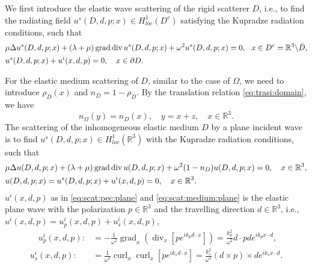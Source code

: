 \documentclass[a4paper,11pt]{article}
\theoremstyle{remark}
\theoremstyle{definition}
\numberwithin{equation}{section}
\DeclareMathOperator{\curl}{curl}
\DeclareMathOperator{\Div}{div}
\DeclareMathOperator{\grad}{grad}
\begin{document}
 We first introduce the elastic wave scattering of the rigid scatterer $D$, i.e., to find the radiating field $u^s(D,d,p;x) \in H^{1}_{loc}(D^c)$ satisfying the Kupradze radiation conditions, such that
\begin{align}
&\mu \Delta u^s(D,d,p;x) +(\lambda + \mu) \grad \Div u^s(D,d,p;x) + \omega^2 u^s(D,d,p;x)  = 0,
 \ \  x \in D^c = \mathbb{R}^3\backslash \bar D, \notag \\
& u^s(D,d,p;x) + u^i(x,d,p) = 0, \quad   x \in \partial D. \label{eq:scat:pec:plane}
\end{align}


For the elastic medium scattering of $D$, similar to the case of $\Omega$, we need to introduce $\rho_{D}(x)$ and $n_{D} =1 -\rho_{D}$. By the translation relation \eqref{eq:trasi:domain}, we have
\begin{equation}\label{eq:n:medium}
n_{\Omega}(y) = n_{D}(x),  \quad y = x+z, \quad x \in \mathbb{R}^3.
\end{equation}
The scattering of the inhomogeneous elastic medium $D$ by a plane incident wave is to find $u^s(D,d,p;x) \in H^{1}_{loc}(\mathbb{R}^3)$ with the Kupradze radiation conditions,  such that
\begin{align}
&\mu \Delta u(D,d,p;x) +(\lambda + \mu) \grad \Div u(D,d,p;x) + \omega^2  (1-n_{D}) u(D,d,p;x)  = 0, \quad x \in \mathbb{R}^3, \notag \\
& u(D,d,p;x)  = u^s(D,d,p;x) + u^i(x,d,p) = 0, \quad x \in \mathbb{R}^3.  \label{eq:scat:medium:plane}
\end{align}
$u^i(x,d,p)$ as in \eqref{eq:scat:pec:plane} and \eqref{eq:scat:medium:plane} is the elastic plane wave with the polarization $p \in \mathbb{R}^3$ and the travelling direction $d \in \mathbb{R}^3$, i.e., $u^{i}(x,d,p) =  u_{p}^{i}(x,d,p) + u_{s}^{i}(x,d,p)$,
\begin{subequations}\label{eq:plane}
\begin{align}
\quad u_{p}^{i}(x,d,p):&= -\frac{1}{\omega^2}\grad_{x} (\Div_{x}[ p e^{ik_p d \cdot x}]) =
\frac{k_{p}^2}{\omega^2} d\cdot p d e^{ik_px\cdot d}, \\
u_{s}^i(x,d,p):&= \frac{1}{\omega^2} \curl_x \curl_x[pe^{ik_sd\cdot x}]=  \frac{k_{s}^2}{\omega^2} (d\times p) \times d e^{ik_sx\cdot d}.
\end{align}
\end{subequations}
\end{document}
